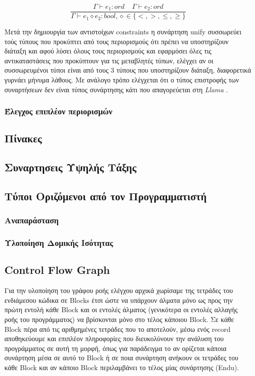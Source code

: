 \documentclass[12pt]{article}
\newcommand{\Llama}{\textit{Llama }}
\begin{document}
$$\frac{\Gamma  \vdash e_1 : ord \;\;\;\; \Gamma  \vdash e_2 : ord  }{\Gamma  \vdash e_1 \diamond e_2 : bool,\diamond \in \lbrace <,>, \leq, \geq\rbrace}$$


Μετά την δημιουργία των αντιστοίχων constraints η συνάρτηση unify συσσωρεύει τούς τύπους που προκύπτει από τους περιορισμούς ότι πρέπει να υποστηρίζουν διάταξη και αφού λύσει όλους τους περιορισμούς και εφαρμόσει όλες τις αντικαταστάσεις που προκύπτουν για τις μεταβλητές τύπων, ελέγχει αν οι συσσωρευμένοι τύποι είναι από τους 3 τύπους που υποστηρίζουν διάταξη, διαφορετικά γυρνάει μήνυμα λάθους. Με ανάλογο τρόπο ελέγχεται ότι ο τύπος επιστροφής των συναρτήσεων δεν είναι τύπος συνάρτησης κάτι που απαγορεύεται στη \Llama. 


\subsubsection{Έλεγχος επιπλέον περιορισμών}





\subsection{Πίνακες}
\subsection{Συναρτησεις Υψηλής Τάξης}
\subsection{Τύποι Οριζόμενοι από τον Προγραμματιστή}
\subsubsection{Αναπαράσταση}
\subsubsection{Υλοποίηση Δομικής Ισότητας}
\subsection{Control Flow Graph}
Για την υλοποίηση του γράφου ροής ελέγχου αρχικά χωρίσαμε της τετράδες του ενδιάμεσου κώδικα σε Blocks έτσι ώστε να υπάρχουν άλματα μόνο ως προς την πρώτη εντολή κάθε Block και οι εντολές άλματος
(γενικότερα οι εντολές αλλαγής ροής του προγράμματος) να βρίσκονται μόνο στο τέλος κάποιου Block. Σε κάθε Block πέρα από τις αριθμημένες τετράδες που το αποτελούν, μέσω ενός record αποθηκεύουμε και επιπλέον πληροφορίες που διευκολύνουν την ανάλυση του προγράμματος σε αυτή τη μορφή, όπως για παράδειγμα το αν ορίζεται κάποια συνάρτηση μέσα σε αυτό το Block ή σε ποια συνάρτηση ανήκουν οι τετράδες του κάθε Block και αν κάποιο Block περιλαμβάνει το τέλος μίας συνάρτησης (Endu).
\end{document}
